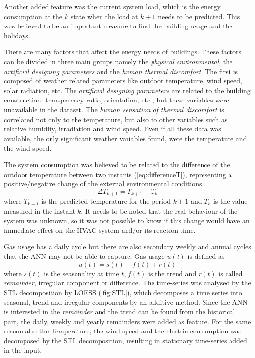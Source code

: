 \documentclass{sig-alternate-sigmod07}
\begin{document}
Another added feature was the current system load, which is the energy consumption at the $k$ state when the load at $k+1$ needs to be predicted. This was believed to be an important measure to find the building usage and the holidays.

There are many factors that affect the energy needs of buildings. These factors can be divided in three main groups namely the \emph{physical environmental}, the \emph{artificial designing parameters} and the \emph{human thermal discomfort}. The first is composed of weather related parameters like outdoor temperature, wind speed, solar radiation, etc. The \emph{artificial designing parameters} are related to the building construction: transparency ratio, orientation, etc \cite{ekici2009prediction}, but these variables were unavailable in the dataset. The \emph{human sensation of thermal discomfort} is correlated not only to the temperature, but also to other variables such as relative humidity, irradiation and wind speed. Even if all these data was available, the only significant weather variables found, were the temperature and the wind speed.

The system consumption was believed to be related to the difference of the outdoor temperature between two instants (\cref{eq:differenceT}), representing a positive/negative change of the external environmental conditions.
\begin{equation}\Delta T_{k+1}=T_{k+1} - T_{k}\label{eq:differenceT}\end{equation} where $T_{k+1}$ is the predicted temperature for the period $k+1$ and $T_k$ is the value measured in the instant $k$. It needs to be noted that the real behaviour of the system was unknown, so it was not possible to know if this change would have an immediate effect on the HVAC system and/or its reaction time.

Gas usage has a daily cycle but there are also secondary weekly and annual cycles that the ANN may not be able to capture. Gas usage $u(t)$ is defined as \begin{displaymath}u(t) = s(t) + f(t) + r(t)\end{displaymath} where $s(t)$ is the seasonality at time $t$, $f(t)$ is the trend and $r(t)$ is called \emph{remainder}, irregular component or difference. The time-series was analysed by the STL decomposition by LOESS \cite{cleveland1990stl}(\cref{fig:STL}), which decomposes a time series into seasonal, trend and irregular components by an additive method. Since the ANN is interested in the \emph{remainder} and the trend can be found from the historical part, the daily, weekly and yearly remainders were added as feature. For the same reason also the Temperature, the wind speed and the electric consumption was decomposed by the STL decomposition, resulting in stationary time-series added in the input.
\end{document}

